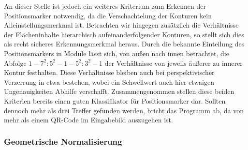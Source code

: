 \documentclass[a4paper, oneside, 12pt]{article}
\begin{document}
An dieser Stelle ist jedoch ein weiteres Kriterium zum Erkennen der Positionsmarker notwendig, da die Verschachtelung der Konturen kein Alleinstellungsmerkmal ist.
Betrachten wir hingegen zusätzlich die Verhältnisse der Flächeninhalte hierarchisch aufeinanderfolgender Konturen, so stellt sich dies als recht sicheres Erkennungsmerkmal heraus. Durch die bekannte Einteilung des Positionsmarkers in Module lässt sich, von außen nach innen betrachtet, die Abfolge $1 - 7^2:5^2 - 1 - 5^2:3^2 - 1$ der Verhältnisse von jeweils äußerer zu innerer Kontur festhalten.
Diese Verhältnisse bleiben auch bei perspektivischer Verzerrung in etwa bestehen, wobei ein Schwellwert auch hier etwaigen Ungenauigkeiten Abhilfe verschafft.
Zusammengenommen stellen diese beiden Kriterien bereits einen guten Klassifikator für Positionsmarker dar. Sollten dennoch mehr als drei Treffer gefunden werden, bricht das Programm ab, da von mehr als einem QR-Code im Eingabebild auszugehen ist.

\subsubsection{Geometrische Normalisierung}
\end{document}
